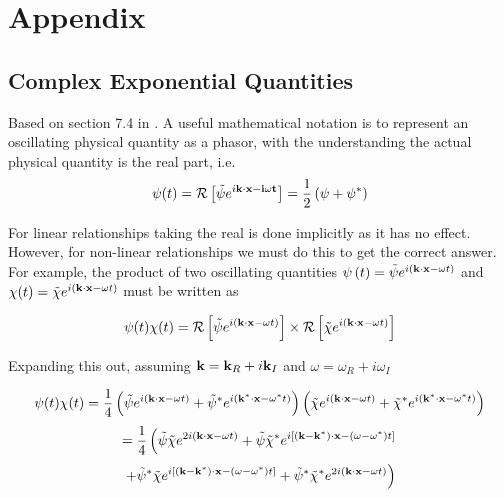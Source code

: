 \section{Appendix}
\subsection{Complex Exponential Quantities}\label{complex exp time averaging}
Based on section 7.4 in \cite{bellan2008fundamentals}.
A useful mathematical notation is to represent an oscillating physical quantity as a phasor, with the understanding the actual physical quantity is the real part, i.e.
\begin{equation}\label{complex_exp_real_part}
	\psi (t) = \mathcal{R} \left[ \tilde{\psi} e^{i \bf{k} \cdot \bf{x} -i \omega t} \right] = \frac{1}{2} \left( \psi + \psi^{*} \right)
\end{equation}

For linear relationships taking the real is done implicitly as it has no effect. However, for non-linear relationships we must do this to get the correct answer. For example, the product of two oscillating quantities $\psi \left( t \right) = \tilde{\psi}e^{i \left(\textbf{k} \cdot \textbf{x} - \omega t \right)}$ and $\chi(t)=\tilde{\chi}e^{i \left(\textbf{k} \cdot \textbf{x} - \omega t \right)}$ must be written as

\begin{equation}
	\psi(t) \chi(t) = \mathcal{R}\left[\tilde{\psi}e^{i \left(\textbf{k} \cdot \textbf{x} - \omega t \right)}\right] \times \mathcal{R}\left[\tilde{\chi}e^{i \left(\textbf{k} \cdot \textbf{x} - \omega t \right)}\right]
\end{equation}

Expanding this out, assuming $\textbf{k} = \textbf{k}_R + i \textbf{k}_I$ and $\omega = \omega_R + i \omega_I$

\begin{equation*}
	\psi(t) \chi(t) = \frac{1}{4}\left( \tilde{\psi} e^{i \left(\textbf{k} \cdot \textbf{x} - \omega t \right)} + \tilde{\psi}^* e^{i \left(\textbf{k}^* \cdot \textbf{x} - \omega^* t \right)} \right)\left( \tilde{\chi} e^{i \left(\textbf{k} \cdot \textbf{x} - \omega t \right)} + \tilde{\chi}^* e^{i \left(\textbf{k}^* \cdot \textbf{x} - \omega^* t \right)} \right)
\end{equation*}
\begin{equation*}
		= \frac{1}{4} \left( \tilde{\psi} \tilde{\chi} e^{2i \left(\textbf{k} \cdot \textbf{x} - \omega t \right)} + \tilde{\psi} \tilde{\chi}^* e^{i \left[\left(\textbf{k} - \textbf{k}^* \right) \cdot \textbf{x} - \left( \omega - \omega^* \right) t \right]} \right.
\end{equation*}
\begin{equation}
		\left. + \tilde{\psi}^* \tilde{\chi} e^{i \left[\left(\textbf{k} - \textbf{k}^* \right) \cdot \textbf{x} - \left( \omega - \omega^* \right) t \right]} + \tilde{\psi}^* \tilde{\chi}^* e^{2i \left(\textbf{k} \cdot \textbf{x} - \omega t \right)} \right)
\end{equation}

